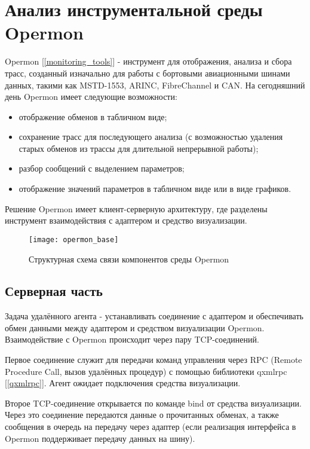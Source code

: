 \section{Анализ инструментальной среды Opermon}

Opermon [\ref{monitoring_tools}] - инструмент для отображения, анализа и сбора трасс, созданный изначально для работы с бортовыми авиационными шинами данных, такими как MSTD-1553, ARINC, FibreChannel и CAN. На сегодняшний день Opermon имеет следующие возможности:

\begin{itemize}
 \item отображение обменов в табличном виде;
 \item сохранение трасс для последующего анализа (с возможностью удаления старых обменов из трассы для длительной непрерывной работы);
 \item разбор сообщений с выделением параметров;
 \item отображение значений параметров в табличном виде или в виде графиков.
\end{itemize}

Решение Opermon имеет клиент-серверную архитектуру, где разделены инструмент взаимодействия с адаптером и средство визуализации. 

\begin{figure}[H]
 \centering
 \texttt{[image: opermon\_base]}
 \caption{Структурная схема связи компонентов среды Opermon}
 \label{fig:opermon_base}
\end{figure}

\subsection{Серверная часть}

\label{agent_base}

Задача удалённого агента - устанавливать соединение с адаптером и обеспечивать обмен данными между адаптером и средством визуализации Opermon. Взаимодействие с Opermon происходит через пару TCP-соединений.

Первое соединение служит для передачи команд управления через RPC (Remote Procedure Call, вызов удалённых процедур) с помощью библиотеки qxmlrpc [\ref{qxmlrpc}]. Агент ожидает подключения средства визуализации.

Второе TCP-соединение открывается по команде bind от средства визуализации. Через это соединение передаются данные о прочитанных обменах, а также сообщения в очередь на передачу через адаптер (если реализация интерфейса в Opermon поддерживает передачу данных на шину).

